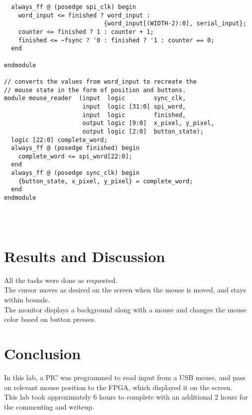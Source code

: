 \documentclass{article}
\begin{document}
\begin{verbatim}
  always_ff @ (posedge spi_clk) begin
    word_input <= finished ? word_input : 
                            {word_input[(WIDTH-2):0], serial_input};
    counter <= finished ? 1 : counter + 1;
    finished <= ~fsync ? '0 : finished ? '1 : counter == 0;
  end
  
endmodule

// converts the values from word_input to recreate the
// mouse state in the form of position and buttons.
module mouse_reader  (input  logic        sync_clk,
                      input  logic [31:0] spi_word,
                      input  logic        finished,
                      output logic [9:0]  x_pixel, y_pixel,
                      output logic [2:0]  button_state);
  logic [22:0] complete_word;
  always_ff @ (posedge finished) begin
    complete_word <= spi_word[22:0];
  end
  always_ff @ (posedge sync_clk) begin
    {button_state, x_pixel, y_pixel} = complete_word;
  end
endmodule
  



\end{verbatim}

\section{Results and Discussion}

All the tasks were done as requested. \\

The cursor moves as desired on the screen when the mouse is moved, and
stays within bounds. \\

The monitor displays a background along with a mouse and changes the
mouse color based on button presses.\\


\section{Conclusion}

In this lab, a PIC was programmed to read input from a USB mouse, and pass on relevant mouse position to the FPGA, which displayed it on the screen.\\


This lab took approximately 6 hours to complete with an additional 2 hours for the commenting and writeup.
\end{document}
